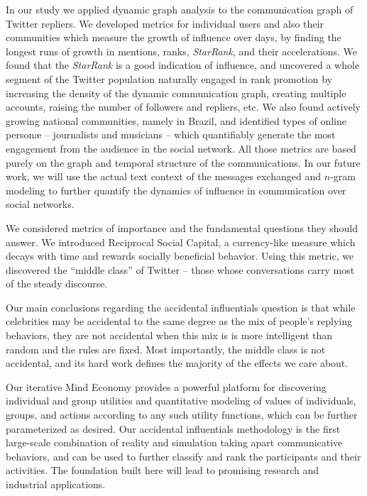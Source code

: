 \documentclass[10pt,oneside]{memoir}
\def\mybibliostyle{plain}
\def\bibliocommand{}
\begin{document}
In our study we applied dynamic graph analysis to the communication graph of Twitter repliers.  We developed metrics for individual users and also their communities which measure the growth of influence over days, by finding the longest runs of growth in mentions, ranks, \emph{StarRank}, and their accelerations.  We found that the \emph{StarRank} is a good indication of influence, and uncovered a whole segment of the Twitter population naturally engaged in rank promotion by increasing the density of the dynamic communication graph, creating multiple accounts, raising the number of followers and repliers, etc.  We also found actively growing national communities, namely in Brazil, and identified types of online personæ -- journalists and musicians -- which quantifiably generate the most engagement from the audience in the social network.  All those metrics are based purely on the graph and temporal structure of the communications.  In our future work, we will use the actual text context of the messages exchanged and $n$-gram modeling to further quantify the dynamics of influence in communication over social networks.


We considered metrics of importance and the fundamental questions they should answer. We introduced Reciprocal Social Capital, a currency-like measure which decays with time and rewards socially beneficial behavior. Using this metric, we discovered the ``middle class'' of Twitter -- those whose conversations carry most of the steady discourse.  


Our main conclusions regarding the accidental influentials question is that while celebrities may be accidental to the same degree as the mix of people's replying behaviors, they are not accidental when this mix is is more intelligent than random and the rules are fixed.  Most importantly, the middle class is not accidental, and its hard work defines the majority of the effects we care about.


Our iterative Mind Economy provides a powerful platform for discovering individual and group utilities and quantitative modeling of values of individuals, groups, and actions according to any such utility functions, which can be further parameterized as desired.  Our accidental influentials methodology is the first large-scale combination of reality and simulation taking apart communicative behaviors, and can be used to further classify and rank the participants and their activities.   The foundation built here will lead to promising research and industrial applications.




\pagebreak \appendixpage*
\appendix

%
%

\backmatter


\bibliocommand

\printglossary


\printindex
\end{document}
